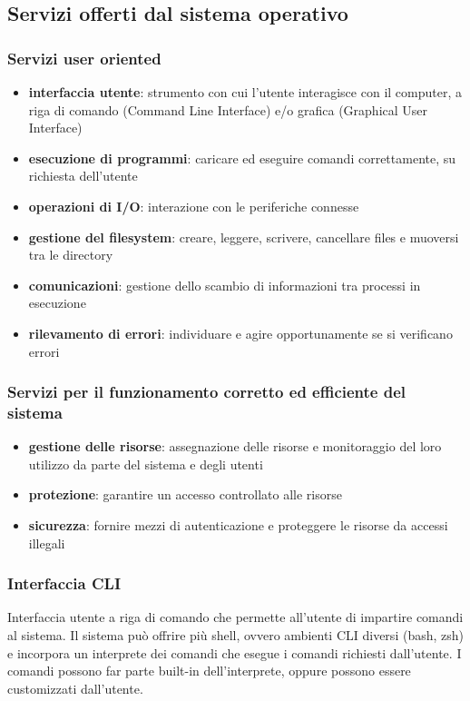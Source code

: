 \documentclass[a4paper]{article}
\begin{document}
\subsection{Servizi offerti dal sistema operativo}
\subsubsection*{Servizi user oriented}
\begin{itemize}
	\item \textbf{interfaccia utente}: strumento con cui l'utente interagisce con il computer, a riga di comando (Command Line
	Interface) e/o grafica (Graphical User Interface)
	\item \textbf{esecuzione di programmi}: caricare ed eseguire comandi correttamente, su richiesta dell'utente
	\item \textbf{operazioni di I/O}: interazione con le periferiche connesse
	\item \textbf{gestione del filesystem}: creare, leggere, scrivere, cancellare files e muoversi tra le directory
	\item \textbf{comunicazioni}: gestione dello scambio di informazioni tra processi in esecuzione
	\item \textbf{rilevamento di errori}: individuare e agire opportunamente se si verificano errori
\end{itemize}

\subsubsection*{Servizi per il funzionamento corretto ed efficiente del sistema}
\begin{itemize}
	\item \textbf{gestione delle risorse}: assegnazione delle risorse e monitoraggio del loro utilizzo da parte del sistema e
	degli utenti
	\item \textbf{protezione}: garantire un accesso controllato alle risorse
	\item \textbf{sicurezza}: fornire mezzi di autenticazione e proteggere le risorse da accessi illegali
\end{itemize}

\subsubsection*{Interfaccia CLI}
Interfaccia utente a riga di comando che permette all'utente di impartire comandi al sistema. Il sistema può offrire più shell,
ovvero ambienti CLI diversi (bash, zsh) e incorpora un interprete dei comandi che esegue i comandi richiesti dall'utente. I
comandi possono far parte built-in dell'interprete, oppure possono essere customizzati dall'utente.
\end{document}
